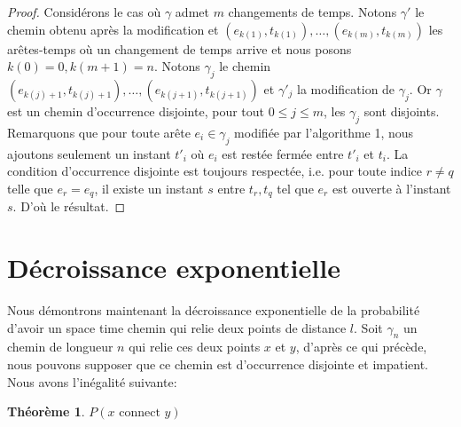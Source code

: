 \documentclass[titlepage,a4paper,12pt]{article}
\newcounter{thm}
\newcounter{algo}
\newtheorem{decexp}[thm]{Théorème}
\begin{document}
\begin{proof}
Considérons le cas où $\gamma$ admet $m$ changements de temps. Notons $\gamma'$ le chemin obtenu après la modification et $(e_{k(1)},t_{k(1)}),\dots,(e_{k(m)},t_{k(m)})$ les arêtes-temps où un changement de temps arrive et nous posons $k(0) = 0,k(m+1)=n$. Notons $\gamma_j$ le chemin $(e_{k(j)+1},t_{k(j)+1}),\dots,(e_{k(j+1)},t_{k(j+1)})$ et $\gamma'_j$ la modification de $\gamma_j$. Or $\gamma$ est un chemin d'occurrence disjointe, pour tout $0\leqslant j \leqslant m$, les $\gamma_j$ sont disjoints. Remarquons que pour toute arête $e_i\in \gamma_j$ modifiée par l'algorithme 1, nous ajoutons seulement un instant $t'_i$ où $e_i$ est restée fermée entre $t'_i$ et $t_i$. La condition d'occurrence disjointe est toujours respectée, i.e. pour toute indice $r \neq q$ telle que $e_r = e_q$, il existe un instant $s$ entre $t_r,t_q$ tel que $e_r$ est ouverte à l'instant $s$. D'où le résultat.
\end{proof}

\section{Décroissance exponentielle}
Nous démontrons maintenant la décroissance exponentielle de la probabilité d'avoir un space time chemin qui relie deux points de distance $l$. Soit $\gamma_n$ un chemin de longueur $n$ qui relie ces deux points $x$ et $y$, d'après ce qui précède, nous pouvons supposer que ce chemin est d'occurrence disjointe et impatient. Nous avons l'inégalité suivante:
\begin{decexp} 
$P(x\text{ connect } y)$
\end{decexp}
\end{document}
